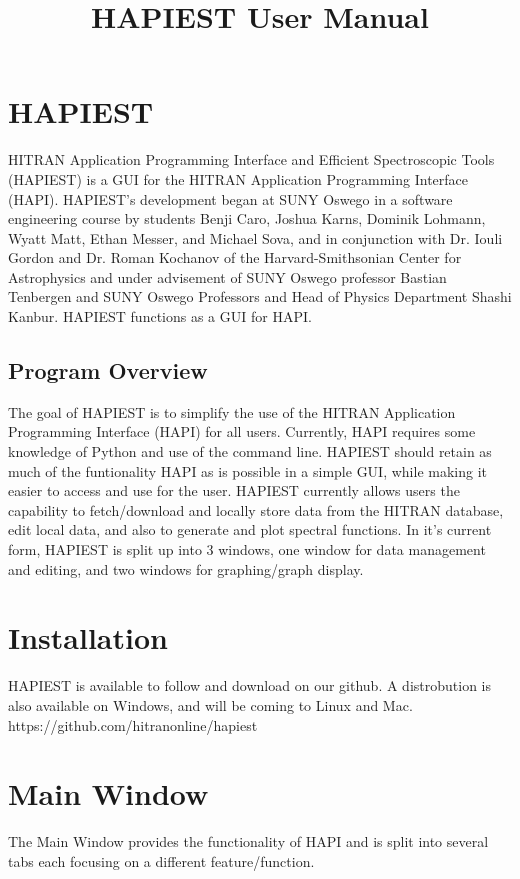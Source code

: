 \documentclass[12pt]{article}
\begin{document}
\title{HAPIEST User Manual} 
\date{}
\maketitle
\thispagestyle{empty}
\newpage

\tableofcontents
\thispagestyle{empty}
\newpage

\setcounter{page}{1}
\section{HAPIEST}
HITRAN Application Programming Interface and Efficient Spectroscopic Tools (HAPIEST) is a GUI for the HITRAN Application Programming Interface (HAPI). HAPIEST's development began at SUNY Oswego in a software engineering course by students Benji Caro, Joshua Karns, Dominik Lohmann, Wyatt Matt, Ethan Messer, and Michael Sova, and in conjunction with Dr. Iouli Gordon and Dr. Roman Kochanov of the Harvard-Smithsonian Center for Astrophysics and under advisement of SUNY Oswego professor Bastian Tenbergen and SUNY Oswego Professors and Head of Physics Department Shashi Kanbur. HAPIEST functions as a GUI for HAPI.
\subsection{Program Overview}
The goal of HAPIEST is to simplify the use of the HITRAN Application Programming Interface (HAPI) for all users. Currently, HAPI requires some knowledge of Python and use of the command line. HAPIEST should retain as much of the funtionality HAPI as is possible in a simple GUI, while making it easier to access and use for the user. HAPIEST currently allows users the capability to fetch/download and locally store data from the HITRAN database, edit local data, and also to generate and plot spectral functions. In it's current form, HAPIEST is split up into 3 windows, one window for data management and editing, and two windows for graphing/graph display.
\section{Installation}
HAPIEST is available to follow and download on our github. A distrobution is also available on Windows, and will be coming to Linux and Mac.
https://github.com/hitranonline/hapiest
\section{Main Window}
The Main Window provides the functionality of HAPI and is split into several tabs each focusing on a different feature/function. 
\end{document}
